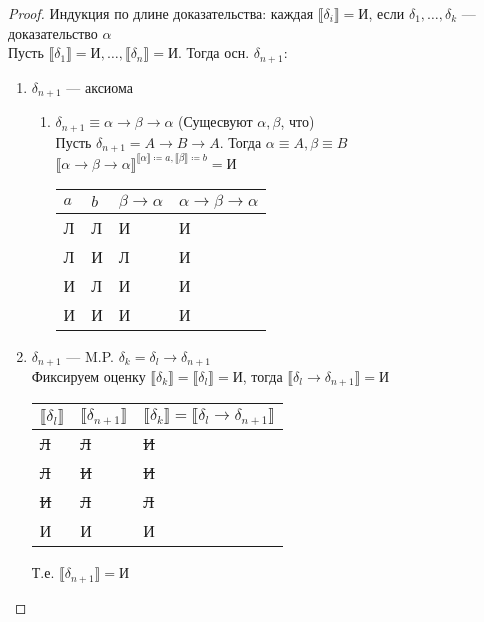 \documentclass[english]{article}
\newcommand{\llb}{\llbracket}
\newcommand{\rrb}{\rrbracket}
\theoremstyle{plain}
\theoremstyle{remark}
\theoremstyle{definition}
\begin{document}
\begin{proof}
Индукция по длине доказательства: каждая \(\llb \delta_i \rrb = \text{И}\), если \(\delta_1, \dots, \delta_k\) --- доказательство \(\alpha\) \\
Пусть \(\llb \delta_1 \rrb = \text{И}, \dots, \llb \delta_n \rrb = \text{И}\). Тогда осн. \(\delta_{n + 1}\):
\begin{enumerate}
\item \(\delta_{n + 1}\) --- аксиома
\begin{enumerate}
\item \(\delta_{n + 1} \equiv \alpha \to \beta \to \alpha\) (Сущесвуют \(\alpha, \beta\), что) \\
Пусть \(\delta_{n + 1} = A \to B \to A\). Тогда \(\alpha \equiv A, \beta \equiv B\) \\
\(\llb \alpha \to \beta \to \alpha \rrb ^{\llb \alpha \rrb \coloneqq a, \llb \beta \rrb \coloneqq b} = \text{И}\)
\begin{center}
\begin{tabular}{ll|l|l}
\(a\) & \(b\) & \(\beta \to \alpha\) & \(\alpha \to \beta \to \alpha\)\\
\hline
Л & Л & И & И\\
Л & И & Л & И\\
И & Л & И & И\\
И & И & И & И\\
\end{tabular}
\end{center}
\end{enumerate}
\item \(\delta_{n + 1}\) --- M.P. \(\delta_k = \delta_l \to \delta_{n + 1}\) \\
Фиксируем оценку \(\llb \delta_k \rrb = \llb \delta_l \rrb = \text{И}\), тогда \(\llb \delta_l \to \delta_{n + 1} \rrb = \text{И}\)
\begin{center}
\begin{tabular}{lll}
\(\llb \delta_l \rrb\) & \(\llb \delta_{n + 1} \rrb\) & \(\llb \delta_k \rrb = \llb \delta_l \to \delta_{n + 1} \rrb\)\\
\hline
\sout{Л} & \sout{Л} & \sout{И}\\
\sout{Л} & \sout{И} & \sout{И}\\
\sout{И} & \sout{Л} & \sout{Л}\\
И & И & И\\
\end{tabular}
\end{center}
Т.е. \(\llb \delta_{n + 1} \rrb = \text{И}\)
\end{enumerate}
\end{proof}
\end{document}
